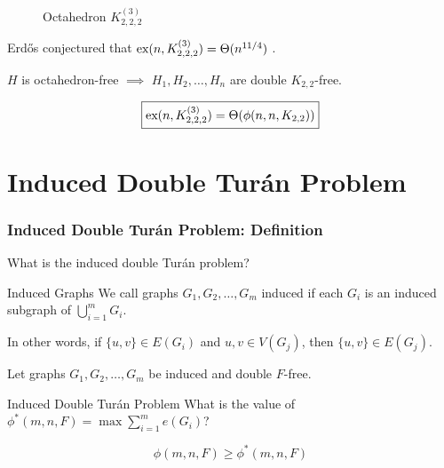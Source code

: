 \documentclass{beamer}
\newcommand*{\ex}{\textnormal{ex}}
\begin{document}
\begin{frame}
{\begin{figure}
      \caption{Octahedron $K_{2,2,2}^{(3)}$}
    \end{figure}

    Erd\H{o}s conjectured that $\ex(n, K_{2,2,2}^{(3)}) = \Theta(n^{11/4})$ \cite{Erdos1964}.

    \vspace{0.1cm}

    \begin{center}
      $H$ is octahedron-free $\implies$ $H_1, H_2, \ldots, H_n$ are double $K_{2,2}$-free.
    \end{center}
  
    \[
      \boxed{\ex(n, K_{2,2,2}^{(3)}) = \Theta(\phi(n, n, K_{2,2}))}
    \]
  }
\end{frame}

\section{Induced Double Turán Problem}

\begin{frame}
  \frametitle{Induced Double Turán Problem: Definition}

  What is the \alert{induced} double Turán problem? \pause

  \begin{block}{Induced Graphs}
    We call graphs $G_1, G_2, \ldots, G_m$ \alert{induced} if each $G_i$ is an induced subgraph of $\bigcup_{i = 1}^m G_i$.
  \end{block}

  \pause

  In other words, if $\{u, v\} \in E(G_i)$ and $u, v \in V(G_j)$, then $\{u, v\} \in E(G_j)$.

  \pause

  \vspace{0.5cm}

  Let graphs $G_1, G_2, \ldots, G_m$ be induced and double $F$-free.

  \begin{block}{Induced Double Turán Problem}
    What is the value of $\phi^*(m, n, F) = \max \sum_{i = 1}^m e(G_i)$?
  \end{block}

  \pause

  \[
    \phi(m, n, F) \geq \phi^*(m, n, F)
  \]
\end{frame}
\end{document}
